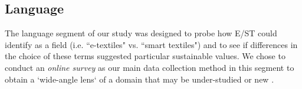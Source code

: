 \documentclass[manuscript,review,anonymous]{acmart}
\begin{document}
\subsection{Language}

The language segment of our study was designed to probe how E/ST could identify as a field (i.e. ``e-textiles" vs. ``smart textiles") and to see if differences in the choice of these terms suggested particular sustainable values.
We chose to conduct an \textit{online survey} as our main data collection method in this segment to obtain a `wide-angle lens` of a domain that may be under-studied or new \cite{braun_online_2020}.  
\end{document}
